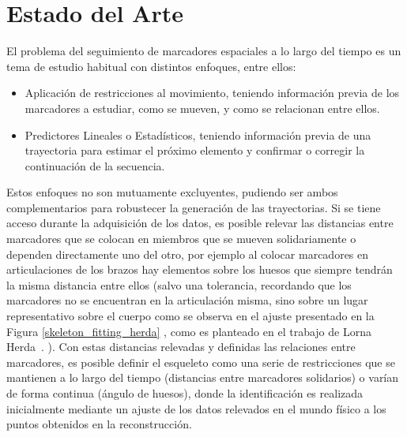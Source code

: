\section{Estado del Arte}

El problema del seguimiento de marcadores espaciales a lo largo del tiempo es un tema de estudio habitual con distintos enfoques, entre ellos:

\begin{itemize}

\item Aplicación de restricciones al movimiento, teniendo información previa de los marcadores a estudiar, como se mueven, y como se relacionan entre ellos. 

\item Predictores Lineales o Estadísticos, teniendo información previa de una trayectoria para estimar el próximo elemento y confirmar o corregir la continuación de la secuencia.

\end{itemize}

Estos enfoques no son mutuamente excluyentes, pudiendo ser ambos complementarios para robustecer la generación de las trayectorias. Si se tiene acceso durante la adquisición de los datos, es posible relevar las distancias entre marcadores que se colocan en miembros que se mueven solidariamente  o dependen directamente uno del otro, por ejemplo al colocar marcadores en articulaciones de los brazos hay elementos sobre los huesos que siempre tendrán la misma distancia entre ellos (salvo una tolerancia, recordando que los marcadores no se encuentran en la articulación misma, sino sobre un lugar representativo sobre el cuerpo como se observa en el ajuste presentado en la Figura \ref{skeleton_fitting_herda} , como es planteado en el trabajo de Lorna Herda~\cite{herda}. ). Con estas distancias relevadas y definidas las relaciones entre marcadores, es posible definir el esqueleto como una serie de restricciones que se mantienen a lo largo del tiempo (distancias entre marcadores solidarios) o varían de forma continua (ángulo de huesos), donde la identificación es realizada inicialmente mediante un ajuste de los datos relevados en el mundo físico a los puntos obtenidos en la reconstrucción. 

